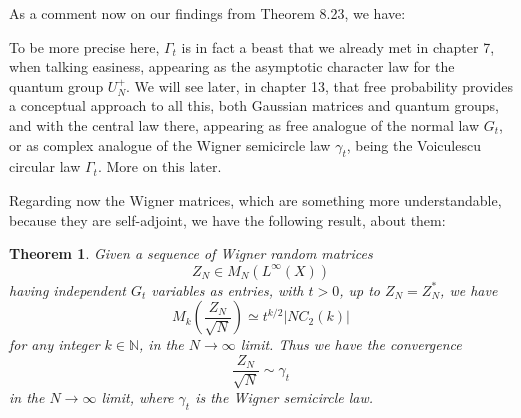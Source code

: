 \documentclass[12pt]{amsbook}
\newtheorem{theorem}{Theorem}[chapter]
\newtheorem{comment}[theorem]{Comment}
\begin{document}
As a comment now on our findings from Theorem 8.23, we have:

To be more precise here, $\Gamma_t$ is in fact a beast that we already met in chapter 7, when talking easiness, appearing as the asymptotic character law for the quantum group $U_N^+$. We will see later, in chapter 13, that free probability provides a conceptual approach to all this, both Gaussian matrices and quantum groups, and with the central law there, appearing as free analogue of the normal law $G_t$, or as complex analogue of the Wigner semicircle law $\gamma_t$, being the Voiculescu circular law $\Gamma_t$. More on this later.

\bigskip
 
Regarding now the Wigner matrices, which are something more understandable, because they are self-adjoint, we have the following result, about them:

\begin{theorem}
Given a sequence of Wigner random matrices
$$Z_N\in M_N(L^\infty(X))$$
having independent $G_t$ variables as entries, with $t>0$, up to $Z_N=Z_N^*$, we have
$$M_k\left(\frac{Z_N}{\sqrt{N}}\right)\simeq t^{k/2}|NC_2(k)|$$
for any integer $k\in\mathbb N$, in the $N\to\infty$ limit. Thus we have the convergence
$$\frac{Z_N}{\sqrt{N}}\sim\gamma_t$$
in the $N\to\infty$ limit, where $\gamma_t$ is the Wigner semicircle law. 

\end{theorem}
\end{document}
